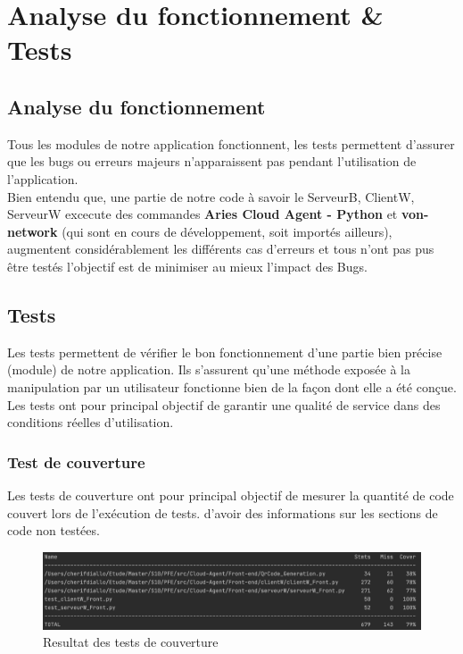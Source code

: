\documentclass[12pt, openany]{report}
\begin{document}
\section{Analyse du fonctionnement \& Tests}
\noindent 
\begin{flushleft}

\subsection{Analyse du fonctionnement}
Tous les modules de notre application fonctionnent, les tests permettent d'assurer que les bugs ou erreurs majeurs n'apparaissent pas pendant l'utilisation de l'application.\\
Bien entendu que, une partie de notre code à savoir le ServeurB, ClientW, ServeurW excecute des commandes \textbf{Aries Cloud Agent - Python} et \textbf{von-network} (qui sont en cours de développement, soit importés ailleurs), augmentent considérablement les différents cas d'erreurs et tous n'ont pas pus être testés l’objectif est de minimiser au mieux l’impact des Bugs.  
\subsection{Tests}
Les tests permettent de vérifier le bon fonctionnement d’une partie bien précise (module) de notre application. Ils s'assurent qu'une méthode exposée à la manipulation par un utilisateur fonctionne bien de la façon dont elle a été conçue.
Les tests ont pour principal objectif de garantir une qualité de service dans des conditions réelles d'utilisation.
\subsubsection{Test de couverture}
Les tests de couverture ont pour principal objectif de mesurer la quantité de code couvert lors de l'exécution de tests. d'avoir des informations sur les sections de code non testées.
\begin{figure}[H]
\includegraphics[scale=0.5]{coverage.png}
\centering
\caption{Resultat des tests de couverture}
\end{figure}


\end{flushleft}
\end{document}
